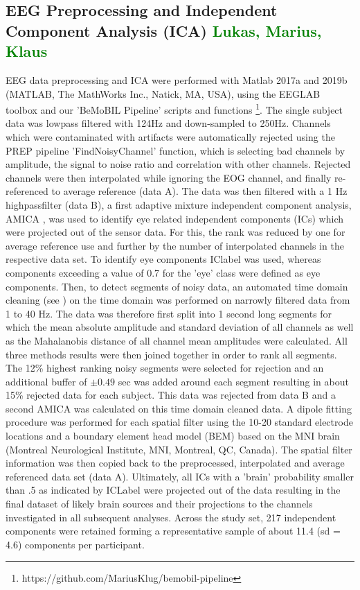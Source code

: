 \subsection{EEG Preprocessing and Independent Component Analysis (ICA) \textcolor{green}{Lukas, Marius, Klaus}}
EEG data preprocessing and ICA were performed with Matlab 2017a and 2019b (MATLAB, The MathWorks Inc., Natick, MA, USA), using the EEGLAB toolbox \cite{Delorme2004a} and our 'BeMoBIL Pipeline' scripts and functions \footnote{https://github.com/MariusKlug/bemobil-pipeline}. The single subject data was lowpass filtered with 124Hz and down-sampled to 250Hz. Channels which were contaminated with artifacts were automatically rejected using the PREP pipeline \cite{Bigdely-Shamlo2015} 'FindNoisyChannel' function, which is selecting bad channels by amplitude, the signal to noise ratio and correlation with other channels. Rejected channels were then interpolated while ignoring the EOG channel, and finally re-referenced to average reference (data A). The data was then filtered with a 1 Hz highpassfilter (data B), a first adaptive mixture independent component analysis, AMICA \cite{Palmer2011}, was used to identify eye related independent components (ICs) which were projected out of the sensor data. For this, the rank was reduced by one for average reference use and further by the number of interpolated channels in the respective data set. To identify eye components IClabel \cite{Pion-Tonachini2019} was used, whereas components exceeding a value of 0.7 for the 'eye' class were defined as eye components. Then, to detect segments of noisy data, an automated time domain cleaning (see \citet{Gramann2018}) on the time domain was performed on narrowly filtered data from 1 to 40 Hz. The data was therefore first split into 1 second long segments for which the mean absolute amplitude and standard deviation of all channels as well as the Mahalanobis distance of all channel mean amplitudes were calculated. All three methods results were then joined together in order to rank all segments. The 12\% highest ranking noisy segments were selected for rejection and an additional buffer of $\pm 0.49$ sec was added around each segment resulting in about 15\% rejected data for each subject. This data was rejected from data B and a second AMICA was calculated on this time domain cleaned data. A dipole fitting procedure was performed for each spatial filter using the 10-20 standard electrode locations and a boundary element head model (BEM) based on the MNI brain (Montreal Neurological Institute, MNI, Montreal, QC, Canada). The spatial filter information was then copied back to the preprocessed, interpolated and average referenced data set (data A). Ultimately, all ICs with a 'brain' probability smaller than .5 as indicated by ICLabel were projected out of the data resulting in the final dataset of likely brain sources and their projections to the channels investigated in all subsequent analyses. Across the study set, 217 independent components were retained forming a representative sample of about 11.4 (sd = 4.6) components per participant.

